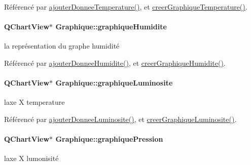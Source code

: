 Référencé par \hyperlink{class_graphique_a42b3c986ca86c426adbb8fdb03a04380}{ajouter\+Donnee\+Temperature()}, et \hyperlink{class_graphique_ad9b976804bafcbfe451d89fd35729d16}{creer\+Graphique\+Temperature()}.

\paragraph[{\texorpdfstring{graphique\+Humidite}{graphiqueHumidite}}]{\setlength{\rightskip}{0pt plus 5cm}Q\+Chart\+View$\ast$ Graphique\+::graphique\+Humidite\hspace{0.3cm}{\ttfamily [private]}}\hypertarget{class_graphique_af57614c61f87539da7bc7e86527162e1}{}\label{class_graphique_af57614c61f87539da7bc7e86527162e1}
la représentation du graphe humidité 

Référencé par \hyperlink{class_graphique_ad3dd36f05a9923054a0a2138f96f0311}{ajouter\+Donnee\+Humidite()}, et \hyperlink{class_graphique_a19d6deef2d11e95093a343d49f75d14e}{creer\+Graphique\+Humidite()}.

\paragraph[{\texorpdfstring{graphique\+Luminosite}{graphiqueLuminosite}}]{\setlength{\rightskip}{0pt plus 5cm}Q\+Chart\+View$\ast$ Graphique\+::graphique\+Luminosite\hspace{0.3cm}{\ttfamily [private]}}\hypertarget{class_graphique_a55f7c2a564ee7ea232a9328ebad29f40}{}\label{class_graphique_a55f7c2a564ee7ea232a9328ebad29f40}
l\textquotesingle{}axe X temperature 

Référencé par \hyperlink{class_graphique_a1af0e1968998cb7b5ee8add1197cb0e0}{ajouter\+Donnee\+Luminosite()}, et \hyperlink{class_graphique_a3b55b9c4732856e1b25bef167c25ac4c}{creer\+Graphique\+Luminosite()}.

\paragraph[{\texorpdfstring{graphique\+Pression}{graphiquePression}}]{\setlength{\rightskip}{0pt plus 5cm}Q\+Chart\+View$\ast$ Graphique\+::graphique\+Pression\hspace{0.3cm}{\ttfamily [private]}}\hypertarget{class_graphique_aa389bad562aa7ccba12aa490e02c672b}{}\label{class_graphique_aa389bad562aa7ccba12aa490e02c672b}
l\textquotesingle{}axe X lumonisité 

